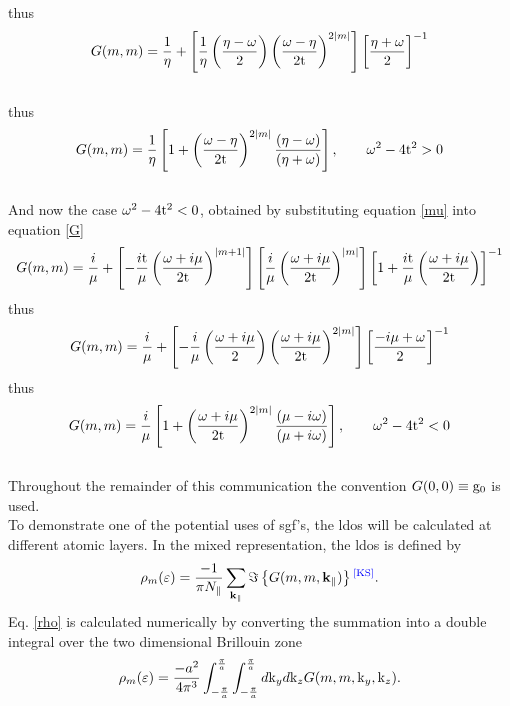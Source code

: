 \documentclass[a4paper, 12pt]{article}
\newcommand{\site}[1]{\textsuperscript{\textcolor{blue}{\cite{#1}}}}
\begin{document}
thus
\begin{equation}
G(m,m)= \frac{1}{\eta}+\left[ \frac{1}{\eta}\left(\frac{\eta -\omega}{2}\right)\left(\frac{\omega -\eta}{2\rm t}\right)^{2|m|}\right]\left[\frac{\eta+\omega}{2}\right]^{-1}
\end{equation}
\\
thus
\begin{equation}
	G(m,m)= \frac{1}{\eta}\left[1+\left(\frac{\omega -\eta}{2\rm t}\right)^{2|m|}\frac{\left(\eta-\omega\right)}{\left(\eta+\omega\right)}\right] , \qquad \omega^2 -4{\rm t}^2>0
\end{equation}
\\
And now the case $\omega^2-4{\rm t}^2<0$, obtained by substituting equation \eqref{mu} into equation \eqref{G}
\begin{equation}
G(m,m)= \frac{i}{\mu}+\left[ -\frac{i\rm t}{\mu}\left(\frac{\omega +i\mu}{2\rm t}\right)^{|m+1|}\right]\left[\frac{i}{\mu}\left(\frac{\omega +i\mu}{2\rm t}\right)^{|m|}\right]\left[1+\frac{i\rm t}{\mu}\left(\frac{\omega +i\mu}{2\rm t}\right)\right]^{-1}
\end{equation}
thus
\begin{equation}
G(m,m)= \frac{i}{\mu}+\left[ -\frac{i}{\mu}\left(\frac{\omega+i\mu}{2}\right)\left(\frac{\omega +i\mu}{2\rm t}\right)^{2|m|}\right]\left[\frac{-i\mu +\omega}{2}\right]^{-1}
\end{equation}
thus
\begin{equation}
	G(m,m)= \frac{i}{\mu}\left[1+\left(\frac{\omega +i\mu}{2\rm t}\right)^{2|m|}\frac{\left(\mu-i\omega\right)}{\left(\mu+i\omega\right)}\right], \qquad \omega^2-4{\rm t}^2<0
\end{equation}
\\
Throughout the remainder of this communication the convention $ G(0,0)\equiv {\rm{g_0}}$ is used.
\\[2mm]To demonstrate one of the potential uses of \gls{sgf}'s, the \acrfull{ldos} will be calculated at different atomic layers.
In the mixed representation, the \gls{ldos} is defined by
\begin{equation}\label{rho}
	\rho_m(\varepsilon)=\frac{-1}{\pi N_\parallel}\sum_{\bf k_\parallel} \Im\left\{ G(m,m,{\bf k_\parallel})\right\}\site{KS}.
\end{equation}
Eq. \eqref{rho} is calculated numerically by converting the summation into a double integral over the two dimensional Brillouin zone
\begin{equation}
	\rho_m(\varepsilon)=\frac{-a^2}{4\pi^3} \int_{-\frac{\pi}{a}}^{\frac{\pi}{a}}\int_{-\frac{\pi}{a}}^{\frac{\pi}{a}} d{\rm k}_y d{\rm k}_z  G(m,m,{\rm k}_y,{\rm k}_z).
\end{equation}
\end{document}
